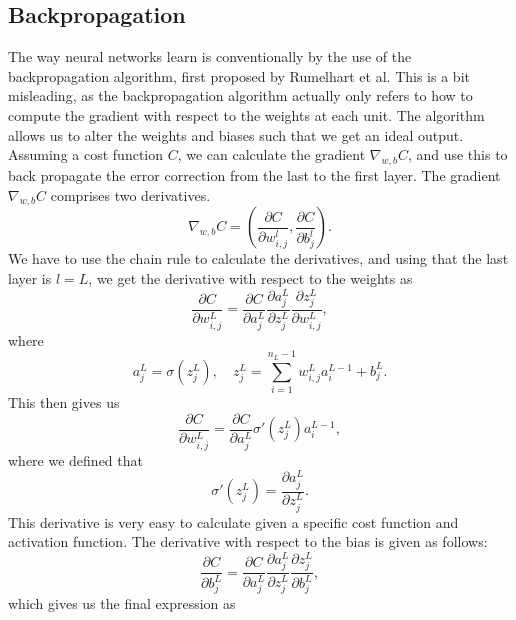 \subsection*{Backpropagation}
The way neural networks learn is conventionally by the use of the backpropagation algorithm, first proposed by 
Rumelhart et al\cite{backprop}. This is a bit misleading, as the backpropagation algorithm actually only refers 
to how to compute the gradient with respect to the weights at each unit\cite{Goodfellow-et-al-2016}. The algorithm allows 
us to alter the weights and biases such that we get an ideal output. Assuming a cost function $C$, we can calculate the 
gradient $\nabla_{w, b}C$, and use this to back propagate the error correction from the last to the first layer. 
The gradient $\nabla_{w, b}C$ comprises two derivatives.
\begin{equation*}
    \nabla_{w, b}C = \left(\frac{\partial C}{\partial w_{i,j}^l}, \frac{\partial C}{\partial b_j^l}\right).
\end{equation*}
We have to use the chain rule to calculate the derivatives, and using that the last layer is $l=L$, we get the derivative with respect to the weights as 
\begin{equation*}
    \frac{\partial C}{\partial w_{i,j}^L} = \frac{\partial C}{\partial a_j^L}\frac{\partial a_j^L}{\partial z_j^L}\frac{\partial z_j^L}{\partial w_{i,j}^L},
\end{equation*}
where 
\begin{equation*}
    a_j^L = \sigma(z_j^L), \quad z_j^L = \sum_{i=1}^{n_L-1} w_{i,j}^La_i^{L-1} + b_j^L.
\end{equation*}
This then gives us 
\begin{equation*}
    \frac{\partial C}{\partial w_{i,j}^L} = \frac{\partial C}{\partial a_j^L}\sigma'(z_j^L)a_i^{L-1},
\end{equation*}
where we defined that 
\begin{equation}\label{eq:sigma_der}
    \sigma'(z_j^L) = \frac{\partial a_j^L}{\partial z_j^L}.
\end{equation}
This derivative is very easy to calculate given a specific cost function and activation function. The derivative with respect to the bias is given as follows:
\begin{equation*}
    \frac{\partial C}{\partial b_j^L} = \frac{\partial C}{\partial a_j^L}\frac{\partial a_j^L}{\partial z_j^L}\frac{\partial z_j^L}{\partial b_{j}^L},
\end{equation*}
which gives us the final expression as 
